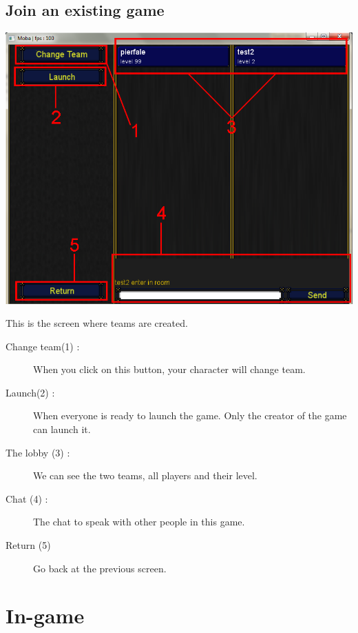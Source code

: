 \documentclass{scrreprt}
\begin{document}
		  \section{Join an existing game}
		  \begin{center}
		  \includegraphics[scale=0.4]{lobby_screen.png}
		  \end{center}
		  This is the screen where teams are created.
		   \begin{description}
		  \item[Change team(1) :]{When you click on this button, your character will change team.}
		  \item[Launch(2) :]{When everyone is ready to launch the game. Only the creator of the game can launch it.}
		  \item[The lobby (3) :]{We can see the two teams, all players and their level.}
		  \item[Chat (4) :]{The chat to speak with other people in this game.}
		  \item[Return (5)] {Go back at the previous screen.}
  		 \end{description}
		  \chapter{In-game}
\end{document}
